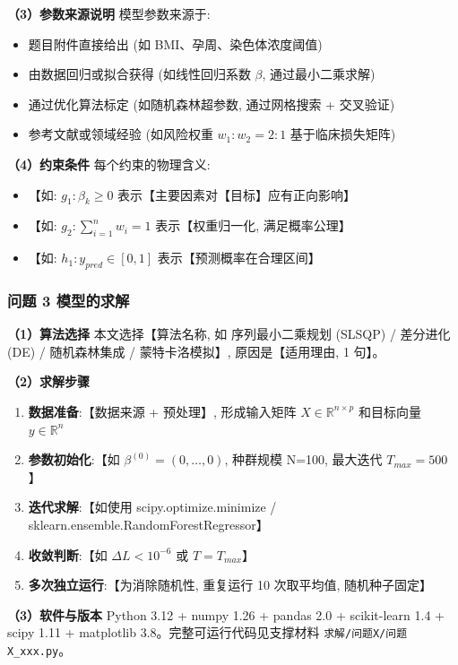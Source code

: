 \textbf{（3）参数来源说明} \quad 模型参数来源于:
\begin{itemize}
  \item 题目附件直接给出 (如 BMI、孕周、染色体浓度阈值)
  \item 由数据回归或拟合获得 (如线性回归系数 $\beta$, 通过最小二乘求解)
  \item 通过优化算法标定 (如随机森林超参数, 通过网格搜索 + 交叉验证)
  \item 参考文献或领域经验 (如风险权重 $w_1:w_2 = 2:1$ 基于临床损失矩阵)
\end{itemize}

\textbf{（4）约束条件} \quad 每个约束的物理含义:
\begin{itemize}
  \item 【如: $g_1: \beta_k \geq 0$ 表示【主要因素对【目标】应有正向影响】
  \item 【如: $g_2: \sum_{i=1}^{n} w_i = 1$ 表示【权重归一化, 满足概率公理】
  \item 【如: $h_1: y_{pred} \in [0,1]$ 表示【预测概率在合理区间】
\end{itemize}

\subsubsection{问题 3 模型的求解}

\textbf{（1）算法选择} \quad 本文选择【算法名称, 如 序列最小二乘规划 (SLSQP) / 差分进化 (DE) / 随机森林集成 / 蒙特卡洛模拟】, 原因是【适用理由, 1 句】。

\textbf{（2）求解步骤}
\begin{enumerate}
  \item \textbf{数据准备}:【数据来源 + 预处理】, 形成输入矩阵 $X \in \mathbb{R}^{n \times p}$ 和目标向量 $y \in \mathbb{R}^n$
  \item \textbf{参数初始化}:【如 $\beta^{(0)} = (0,\ldots,0)$, 种群规模 N=100, 最大迭代 $T_{max}=500$】
  \item \textbf{迭代求解}:【如使用 scipy.optimize.minimize / sklearn.ensemble.RandomForestRegressor】
  \item \textbf{收敛判断}:【如 $\Delta L < 10^{-6}$ 或 $T = T_{max}$】
  \item \textbf{多次独立运行}:【为消除随机性, 重复运行 10 次取平均值, 随机种子固定】
\end{enumerate}

\textbf{（3）软件与版本} \quad Python 3.12 + numpy 1.26 + pandas 2.0 + scikit-learn 1.4 + scipy 1.11 + matplotlib 3.8。完整可运行代码见支撑材料 \texttt{求解/问题X/问题X\_xxx.py}。

